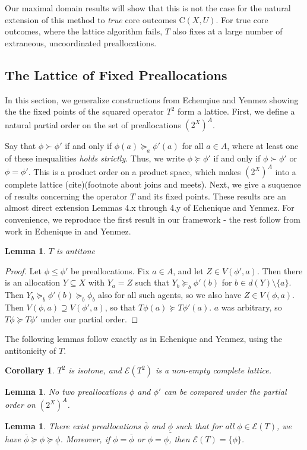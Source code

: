 \documentclass[11pt,reqno]{amsart}
\newtheorem{lemma}[thm]{Lemma}
\newtheorem{cor}[thm]{Corollary}
\theoremstyle{definition}
\numberwithin{equation}{section}
\newcommand{\prf}{\begin{proof}}
\newcommand{\eprf}{\end{proof}}
\newcommand{\ol}{\overline}
\newcommand{\ul}{\underline}
\newcommand{\pre}{\phi}
\newcommand{\prealloc}{(2^X)^A}
\newcommand{\sub}{\subseteq}
\newcommand{\core}{\mathrm{C}(X,U)}
\newcommand{\fix}{\mathcal{E}}
\newcommand{\suq}{\succeq}
\newcommand{\su}{\succ}
\begin{document}
Our maximal domain results will show that this is not the case for the natural extension of this method to \emph{true} core outcomes $\core$.
For true core outcomes, where the lattice algorithm fails, $T$ also fixes at a large number of extraneous, uncoordinated preallocations. 
\subsection{The Lattice of Fixed Preallocations}
In this section, we generalize constructions from Echenqiue and Yenmez showing the the fixed points of the squared operator $T^2$ form a lattice. 
First, we define a natural partial order on the set of preallocations $\prealloc$.

Say that $\pre \su \pre'$ if and only if $\pre(a) \suq_a \pre'(a)$ for all $a \in A$, where at least one of these inequalities \emph{holds strictly}. 
Thus, we write $\pre \suq \pre'$ if and only if $\pre \su \pre'$ or $\pre = \pre'$. 
This is a product order on a product space, which makes $\prealloc$ into a complete lattice (cite)(footnote about joins and meets). 
Next, we give a suquence of results concerning the operator $T$ and its fixed points. 
These results are an almost direct extension Lemmas 4.x through 4.y of Echenique and Yenmez.
For convenience, we reproduce the first result in our framework - the rest follow from work in Echenique in and Yenmez. 
\begin{lemma} \label{lemma:antitone}
$T$ is antitone 
\end{lemma}
\prf
Let $\pre \leq \pre'$ be preallocations.
Fix $a \in A$, and let $Z \in V(\pre',a)$.
Then there is an allocation $Y \sub X$ with $Y_a = Z$ such that $Y_b \suq_b \pre'(b)$ for $b \in d(Y) \setminus \{a\}$.
Then $Y_b \suq_b \pre'(b) \suq_b \pre_b$ also for all such agents, so we also have $Z \in V(\pre,a)$.
Then $V(\pre,a) \supseteq V(\pre',a)$, so that $T\pre(a) \suq T\pre'(a)$. $a$ was arbitrary, so $T\pre \suq T\pre'$ under our partial order. 
\eprf
The following lemmas follow exactly as in Echenique and Yenmez, using the antitonicity of $T$. 
\begin{cor} $T^2$ is isotone, and $\fix(T^2)$ is a non-empty complete lattice. 
\end{cor}
\begin{lemma} \label{lemma:order}
No two preallocations $\pre$ and $\pre'$ can be compared under the partial order on $\prealloc$.
\end{lemma}
\begin{lemma} \label{lemma:top}
There exist preallocations $\ol{\pre}$ and $\ul{\pre}$ such that for all $\pre \in \fix(T)$, we have $\ol{\pre} \suq \pre \suq \ul{\pre}$. Moreover, if $\pre = \ol{\pre}$ or $\pre = \ul{\pre}$, then $\fix(T) = \{\pre\}$. 
\end{lemma}
\end{document}
